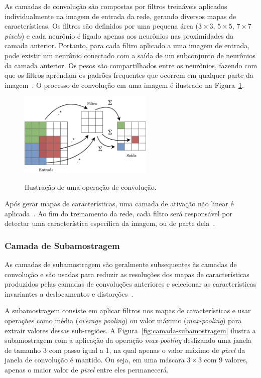As camadas de convolução são compostas por filtros treináveis aplicados individualmente na imagem de entrada da rede, gerando diversos mapas de características. Os filtros são definidos por uma pequena área ($3\times3$, $5\times5$, $7\times7$ \textit{pixels}) e cada neurônio é ligado apenas aos neurônios nas proximidades da camada anterior. Portanto, para cada filtro aplicado a uma imagem de entrada, pode existir um neurônio conectado com a saída de um subconjunto de neurônios da camada anterior. Os pesos são compartilhados entre os neurônios, fazendo com que os filtros aprendam os padrões frequentes que ocorrem em qualquer parte da imagem~\cite{5537907,GUO201627}. O processo de convolução em uma imagem é ilustrado na Figura~\ref{fig:camada-convolucao}.

\begin{figure}[!ht]
    \centering
    \caption{Ilustração de uma operação de convolução.}
    \includegraphics[width=0.57\textwidth]{figuras/camada-convolucao.png}
    \label{fig:camada-convolucao}
\end{figure}

Após gerar mapas de características, uma camada de ativação não linear é aplicada~\cite{WU2020}. Ao fim do treinamento da rede, cada filtro será responsável por detectar uma característica específica da imagem, ou de parte dela~\cite{hafemann:14}.

\subsubsection{Camada de Subamostragem}
\label{sec:camada-subamostragem}

As camadas de subamostragem são geralmente subsequentes às camadas de convolução e são usadas para reduzir as resoluções dos mapas de características produzidos pelas camadas de convoluções anteriores e selecionar as características invariantes a deslocamentos e distorções~\cite{5537907,hafemann:14}.

A subamostragem consiste em aplicar filtros nos mapas de características e usar operações como média (\textit{average pooling}) ou valor máximo (\textit{max-pooling}) para extrair valores dessas sub-regiões. A Figura~\ref{fig:camada-subamostragem} ilustra a subamostragem com a aplicação da operação \textit{max-pooling} deslizando uma janela de tamanho 3 com passo igual a 1, na qual apenas o valor máximo de \textit{pixel} da janela de convolução é mantido. Ou seja, em uma máscara $3\times3$ com 9 valores, apenas o maior valor de \textit{pixel} entre eles permanecerá.

